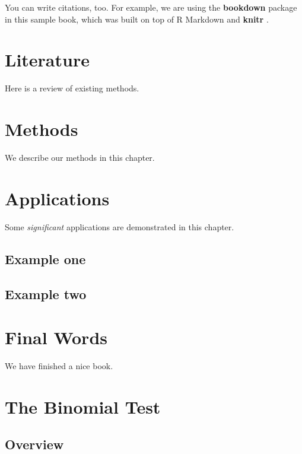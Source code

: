 \documentclass[
]{book}
\begin{document}
You can write citations, too. For example, we are using the \textbf{bookdown} package \citep{R-bookdown} in this sample book, which was built on top of R Markdown and \textbf{knitr} \citep{xie2015}.

\hypertarget{literature}{%
\chapter{Literature}\label{literature}}

Here is a review of existing methods.

\hypertarget{methods}{%
\chapter{Methods}\label{methods}}

We describe our methods in this chapter.

\hypertarget{applications}{%
\chapter{Applications}\label{applications}}

Some \emph{significant} applications are demonstrated in this chapter.

\hypertarget{example-one}{%
\section{Example one}\label{example-one}}

\hypertarget{example-two}{%
\section{Example two}\label{example-two}}

\hypertarget{final-words}{%
\chapter{Final Words}\label{final-words}}

We have finished a nice book.

\hypertarget{the-binomial-test}{%
\chapter{The Binomial Test}\label{the-binomial-test}}

\hypertarget{overview}{%
\section{Overview}\label{overview}}
\end{document}
